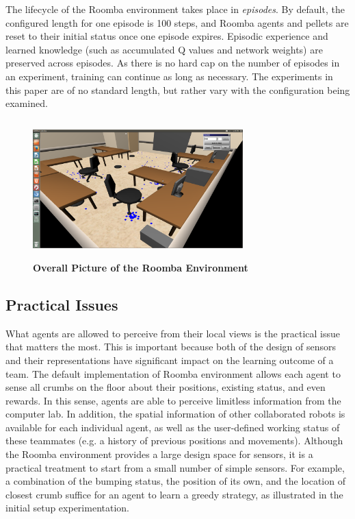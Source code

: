 \documentclass[conference]{IEEEtran}
\begin{document}
The lifecycle of the Roomba environment takes place in \textit{episodes}. 
By default, the configured length for one episode is 100 steps, and
Roomba agents and pellets are
reset to their initial status once one episode expires. 
Episodic experience and learned knowledge
(such as accumulated Q values and network weights) are preserved across episodes.  
As there is no hard cap on the number of episodes in an experiment, training can continue as long as necessary. The experiments in this paper are of no standard length, but rather vary with the configuration being examined.

\begin{figure}[!t]
\centering
\includegraphics[width=3.2in,height=2.1in]{./figures/roombas/roomba2.png}
\caption{\textbf{Overall Picture of the Roomba Environment}}
\label{roomba:world}
\end{figure}

\subsection{Practical Issues}
What agents are allowed to perceive from their local views is the practical
issue that matters the most. 
This is important because both of the design of sensors and their
representations have significant impact on the learning outcome of a team. 
The default implementation of Roomba environment allows each agent to sense
all crumbs on the floor about their positions, existing status, and even rewards. 
In this sense, agents are able to perceive limitless information from the
computer lab. 
In addition, the spatial information of other collaborated robots
is available for each individual agent, as well as the user-defined working
status of these teammates (e.g. a history of previous positions and
movements).  Although the Roomba environment provides a large design space for
sensors, it is a practical treatment to start from a small number of simple
sensors. For example, a combination of the bumping status, the position of its
own, and the location of closest crumb suffice for an agent to learn a greedy
strategy, as illustrated in the initial setup experimentation.  
\end{document}
